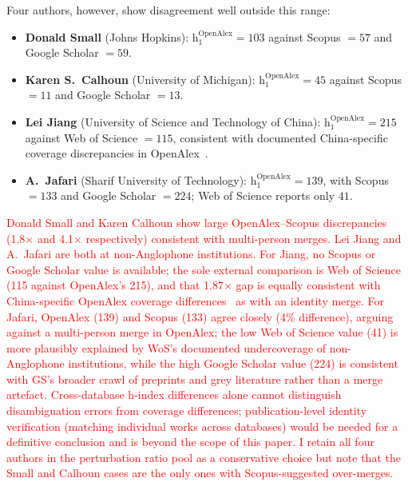 Four authors, however, show disagreement well outside this range:
\begin{itemize}
	\item \textbf{Donald Small} (Johns Hopkins): $\mathrm{h}_1^{\mathrm{OpenAlex}}=103$ against Scopus $=57$ and Google Scholar $=59$.
	\item \textbf{Karen S.\ Calhoun} (University of Michigan): $\mathrm{h}_1^{\mathrm{OpenAlex}}=45$ against Scopus $=11$ and Google Scholar $=13$.
	\item \textbf{Lei Jiang} (University of Science and Technology of China): $\mathrm{h}_1^{\mathrm{OpenAlex}}=215$ against Web of Science $=115$, consistent with documented China-specific coverage discrepancies in OpenAlex~\citep{zheng2025}.
	\item \textbf{A.\ Jafari} (Sharif University of Technology): $\mathrm{h}_1^{\mathrm{OpenAlex}}=139$, with Scopus $=133$ and Google Scholar $=224$; Web of Science reports only $41$.
\end{itemize}
\textcolor{red}{Donald Small and Karen Calhoun show large OpenAlex--Scopus discrepancies (1.8$\times$ and 4.1$\times$ respectively) consistent with multi-person merges. \textcolor{red}{Lei Jiang and A.\ Jafari are both at non-Anglophone institutions. For Jiang, no Scopus or Google Scholar value is available; the sole external comparison is Web of Science (115 against OpenAlex's 215), and that 1.87$\times$ gap is equally consistent with China-specific OpenAlex coverage differences~\citep{zheng2025} as with an identity merge. For Jafari, OpenAlex (139) and Scopus (133) agree closely (4\% difference), arguing against a multi-person merge in OpenAlex; the low Web of Science value (41) is more plausibly explained by WoS's documented undercoverage of non-Anglophone institutions, while the high Google Scholar value (224) is consistent with GS's broader crawl of preprints and grey literature rather than a merge artefact.} Cross-database h-index differences alone cannot distinguish disambiguation errors from coverage differences; publication-level identity verification (matching individual works across databases) would be needed for a definitive conclusion and is beyond the scope of this paper. I retain all four authors in the perturbation ratio pool as a conservative choice but note that the Small and Calhoun cases are the only ones with Scopus-suggested over-merges.}
